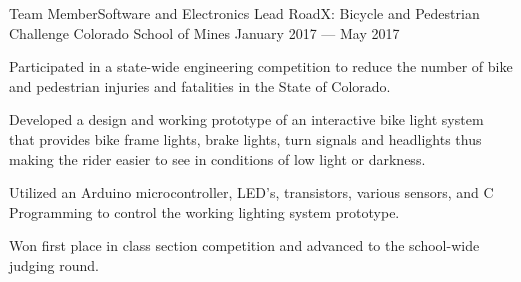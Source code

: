 \begin{cventries}


  \cventry
    {Team Member{\enskip\cdotp\enskip}Software and Electronics Lead} %
    {RoadX\@: Bicycle and Pedestrian Challenge} %
    {Colorado School of Mines} %
    {January 2017 --- May 2017} %
    {
      \begin{cvitems} %
        \item {Participated in a state-wide engineering competition to reduce the number of bike and pedestrian injuries and fatalities in the State of Colorado.}
        \item {Developed a design and working prototype of an interactive bike light system that provides bike frame lights, brake lights, turn signals and headlights thus making the rider easier to see in conditions of low light or darkness.}
        \item {Utilized an Arduino microcontroller, LED's, transistors, various sensors, and C Programming to control the working lighting system prototype.}
        \item {Won first place in class section competition and advanced to the school-wide judging round.}
      \end{cvitems}
    }


\end{cventries}
